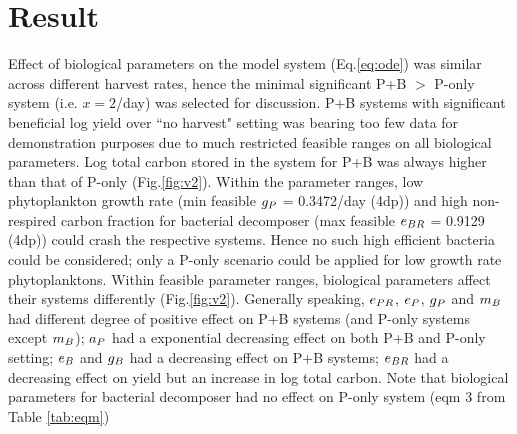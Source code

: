 \documentclass[../thesis.tex]{subfiles} %
\begin{document}
\section{Result}

Effect of biological parameters on the model system (Eq.\ref{eq:ode}) was similar across different harvest rates, hence the minimal significant P+B $>$ P-only system (i.e. $x=2$/day) was selected for discussion.  P+B systems with significant beneficial log yield over ``no harvest" setting was bearing too few data for demonstration purposes due to much restricted feasible ranges on all biological parameters.  Log total carbon stored in the system for P+B was always higher than that of P-only (Fig.\ref{fig:v2}).  Within the parameter ranges, low phytoplankton growth rate (min feasible $g_P$ = 0.3472/day (4dp)) and high non-respired carbon fraction for bacterial decomposer (max feasible $e_{BR}$ = 0.9129 (4dp)) could crash the respective systems.  Hence no such high efficient bacteria could be considered; only a P-only scenario could be applied for low growth rate phytoplanktons.  Within feasible parameter ranges, biological parameters affect their systems differently (Fig.\ref{fig:v2}).  Generally speaking, $e_{PR}$, $e_P$, $g_P$ and $m_B$ had different degree of positive effect on P+B systems (and P-only systems except $m_B$); $a_P$ had a exponential decreasing effect on both P+B and P-only setting; $e_B$ and $g_B$ had a decreasing effect on P+B systems; $e_{BR}$ had a decreasing effect on yield but an increase in log total carbon.  Note that biological parameters for bacterial decomposer had no effect on P-only system (eqm 3 from Table \ref{tab:eqm})
\end{document}
